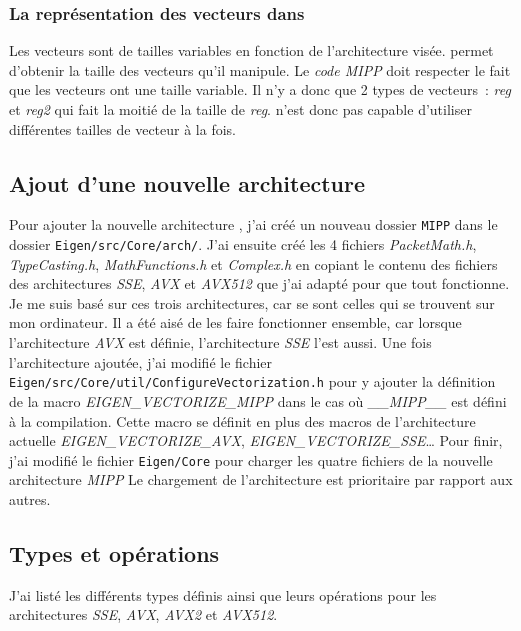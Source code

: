 \subsubsection{La représentation des vecteurs dans \MIPP}
{
  Les vecteurs sont de tailles variables en fonction de l'architecture visée. \MIPP permet
  d'obtenir la taille des vecteurs qu'il manipule. Le \emph{code MIPP} doit respecter
  le fait que les vecteurs ont une taille variable. Il n'y a donc que 2 types de vecteurs :
  \emph{reg} et \emph{reg2} qui fait la moitié de la taille de \emph{reg}.
  \MIPP n'est donc pas capable d'utiliser différentes tailles de vecteur à la fois.
}

\subsection{Ajout d'une nouvelle architecture \MIPP}

Pour ajouter la nouvelle architecture \MIPP, j'ai créé un nouveau dossier \verb|MIPP|
dans le dossier \verb|Eigen/src/Core/arch/|. J'ai ensuite créé les 4 fichiers
\emph{PacketMath.h}, \emph{TypeCasting.h}, \emph{MathFunctions.h} et \emph{Complex.h}
en copiant le contenu des fichiers des architectures \emph{SSE}, \emph{AVX} et \emph{AVX512}
que j'ai adapté pour que tout fonctionne. Je me suis basé sur ces trois architectures,
car se sont celles qui se trouvent sur mon ordinateur. Il a été aisé de les faire fonctionner
ensemble, car lorsque l'architecture \emph{AVX} est définie, l'architecture \emph{SSE} l'est
aussi.
Une fois l'architecture ajoutée, j'ai modifié le fichier
\verb|Eigen/src/Core/util/ConfigureVectorization.h| pour y ajouter la définition de la
macro \emph{EIGEN_VECTORIZE_MIPP} dans le cas où \emph{__MIPP__} est défini à la
compilation. Cette macro se définit en plus des macros de l'architecture actuelle
\emph{EIGEN_VECTORIZE_AVX}, \emph{EIGEN_VECTORIZE_SSE}\dots\space
Pour finir, j'ai modifié le fichier \verb|Eigen/Core| pour charger les quatre fichiers
de la nouvelle architecture \emph{MIPP} Le chargement de l'architecture \MIPP est prioritaire
par rapport aux autres.

\subsection{Types et opérations \Eigen}

J'ai listé les différents types \Eigen définis ainsi que leurs opérations pour les
architectures \emph{SSE}, \emph{AVX}, \emph{AVX2} et \emph{AVX512}.

